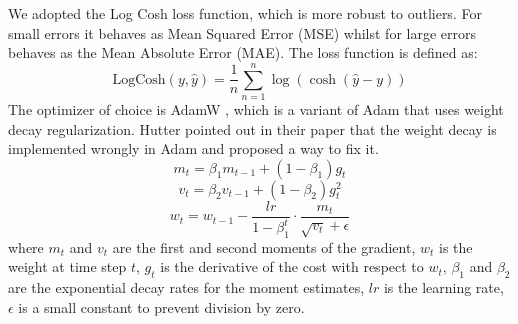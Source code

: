 We adopted the Log Cosh loss function\cite{moshagen2021finding}, which is more robust to outliers.
For small errors it behaves as Mean Squared Error (MSE) whilst for large errors behaves as the Mean Absolute Error (MAE).
The loss function is defined as:
\begin{equation}
\label{eq:logcosh}
\text{LogCosh}(y, \hat{y}) = \frac{1}{n} \sum_{n = 1}^{n} \log(\cosh(\hat{y} - y))
\end{equation}
The optimizer of choice is AdamW \cite{loshchilov2019decoupled}, which is a variant of Adam \cite{kingma2017adam} that uses weight decay regularization.
Hutter pointed out in their paper that the weight decay is implemented wrongly in Adam and proposed a way to fix it.
\begin{equation}
\label{eq:first_moment}
m_t = \beta_1 m_{t-1} + (1 - \beta_1) g_t
\end{equation}
\begin{equation}
\label{eq:second_moment}
v_t = \beta_2 v_{t-1} + (1 - \beta_2) g_t^2
\end{equation}
\begin{equation}
\label{eq:weight_update}
w_t = w_{t-1} - \frac{lr}{1 - \beta_1^t} \cdot \frac{m_t}{\sqrt{v_t} + \epsilon}
\end{equation}
where $m_t$ and $v_t$ are the first and second moments of the gradient, $w_t$ is the weight at time step $t$, $g_t$ is the derivative of the cost with respect to $w_t$, $\beta_1$ and $\beta_2$ are the exponential decay rates for the moment estimates, $lr$ is the learning rate, $\epsilon$ is a small constant to prevent division by zero.